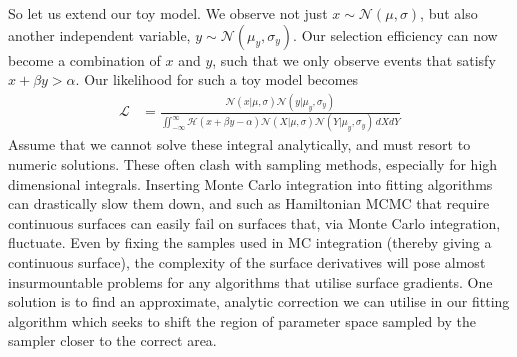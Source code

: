 \documentclass[a4paper,fleqn,usenatbib]{mnras}
\begin{document}
So let us extend our toy model. We observe not just $x \sim \mathcal{N}(\mu, \sigma)$, but also another independent variable, $y \sim \mathcal{N}(\mu_y, \sigma_y)$. Our selection efficiency can now become a combination of $x$ and $y$, such that we only observe events that satisfy $x + \beta y > \alpha$.  Our likelihood for such a toy model becomes
\begin{align}
\mathcal{L} &= \frac{ \mathcal{N}(x|\mu, \sigma) \mathcal{N}(y|\mu_y, \sigma_y)}
{\iint_{-\infty}^\infty \mathcal{H}(x + \beta y - \alpha) \mathcal{N}(X|\mu, \sigma) \mathcal{N}(Y|\mu_y, \sigma_y)\, dX dY}
\end{align}
Assume that we cannot solve these integral analytically, and must resort to numeric solutions. These often clash with sampling methods, especially for high dimensional integrals. Inserting Monte Carlo integration into fitting algorithms can drastically slow them down, and such as Hamiltonian MCMC that require continuous surfaces can easily fail on surfaces that, via Monte Carlo integration, fluctuate. Even by fixing the samples used in MC integration (thereby giving a continuous surface), the complexity of the surface derivatives will pose almost insurmountable problems for any algorithms that utilise surface gradients. One solution is to find an approximate, analytic correction we can utilise in our fitting algorithm which seeks to shift the region of parameter space sampled by the sampler closer to the correct area.
\end{document}
